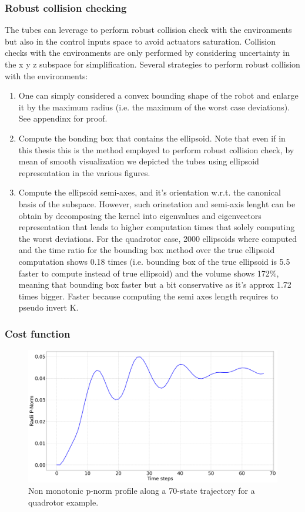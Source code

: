 \subsubsection{Robust collision checking}
The tubes can leverage to perform robust collision check with the environments but also in the control inputs space to avoid actuators saturation. 
Collision checks with the environments are only performed by considering uncertainty in the x y z subspace for simplification.
Several strategies to perform robust collision with the environments:
\begin{enumerate}
    \item One can simply considered a convex bounding shape of the robot and enlarge it by the maximum radius (i.e. the maximum of the worst case deviations). See appendinx for proof.
    \item Compute the bonding box that contains the ellipsoid. Note that even if in this thesis this is the method employed to perform robust collision check, by mean of smooth visualization we depicted the tubes using ellipsoid representation in the various figures.
    \item Compute the ellipsoid semi-axes, and it's orientation w.r.t. the canonical basis of the subspace. However, such orinetation and semi-axis lenght can be obtain by decomposing the kernel into eigenvalues and eigenvectors representation that leads to higher computation times that solely computing the worst deviations. For the quadrotor case, 2000 ellipsoids where computed and the time ratio for the bounding box method over the true ellipsoid computation shows 0.18 times (i.e. bounding box of the true ellipsoid is 5.5 faster to compute instead of true ellipsoid) and the volume shows 172\%, meaning that bounding box faster but a bit conservative as it's approx 1.72 times bigger. Faster because computing the semi axes length requires to pseudo invert K.
\end{enumerate}

\subsubsection{Cost function}

\begin{figure} [t]
    \centering
    \includegraphics[width=0.8\linewidth]{figures/samp/non_monotoic.png} 
    \caption{Non monotonic p-norm profile along a 70-state trajectory for a quadrotor example.}%
    \label{fig:monotonic}%
\end{figure}

